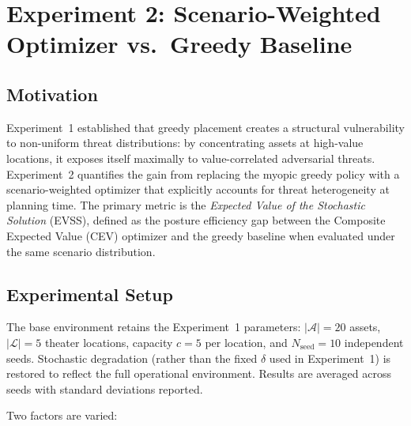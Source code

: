 \documentclass[11pt]{article}
\begin{document}
\section{Experiment 2: Scenario-Weighted Optimizer vs.\ Greedy Baseline}
\label{sec:exp2}

\subsection{Motivation}

Experiment~1 established that greedy placement creates a structural
vulnerability to non-uniform threat distributions: by concentrating assets
at high-value locations, it exposes itself maximally to value-correlated
adversarial threats.
Experiment~2 quantifies the gain from replacing the myopic greedy policy
with a scenario-weighted optimizer that explicitly accounts for threat
heterogeneity at planning time.
The primary metric is the \emph{Expected Value of the Stochastic Solution}
(EVSS), defined as the posture efficiency gap between the
Composite Expected Value (CEV) optimizer and the greedy baseline when
evaluated under the same scenario distribution.

\subsection{Experimental Setup}
\label{sec:exp2:setup}

The base environment retains the Experiment~1 parameters:
$|\mathcal{A}| = 20$ assets, $|\mathcal{L}| = 5$ theater locations,
capacity $c = 5$ per location, and $N_\mathrm{seed} = 10$ independent seeds.
Stochastic degradation (rather than the fixed $\delta$ used in
Experiment~1) is restored to reflect the full operational environment.
Results are averaged across seeds with standard deviations reported.

Two factors are varied:
\end{document}

